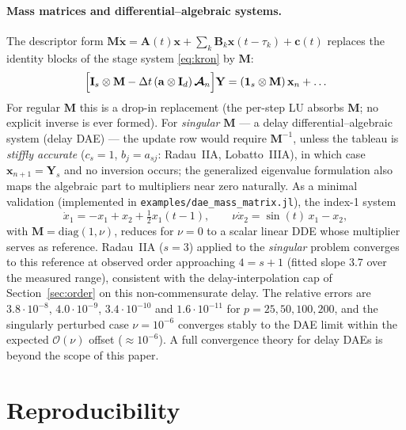 \documentclass[Afour,sageh,times]{sagej}
\begin{document}
\paragraph{Mass matrices and differential--algebraic systems.} The
descriptor form $\mathbf{M}\dot{\mathbf{x}} = \mathbf{A}(t)\mathbf{x} +
\sum_k \mathbf{B}_k \mathbf{x}(t-\tau_k) + \mathbf{c}(t)$ replaces the
identity blocks of the stage system \eqref{eq:kron} by $\mathbf{M}$:
\begin{equation}
  \Bigl[\mathbf{I}_{s}\otimes\mathbf{M}
        - \Delta t\,(\mathbf{a}\otimes\mathbf{I}_d)\,
        \boldsymbol{\mathcal{A}}_n\Bigr]\mathbf{Y}
  = (\mathbf{1}_{s}\otimes\mathbf{M})\,\mathbf{x}_n + \ldots
\end{equation}
For regular $\mathbf{M}$ this is a drop-in replacement (the per-step LU
absorbs $\mathbf{M}$; no explicit inverse is ever formed). For
\emph{singular} $\mathbf{M}$ --- a delay differential--algebraic system
(delay DAE) ---
the update row would require $\mathbf{M}^{-1}$, unless the tableau is
\emph{stiffly accurate} ($c_s = 1$, $b_j = a_{sj}$: Radau~IIA,
Lobatto~IIIA), in which case $\mathbf{x}_{n+1} = \mathbf{Y}_s$ and no
inversion occurs; the generalized eigenvalue formulation also maps the
algebraic part to multipliers near zero naturally. As a minimal validation
(implemented in \texttt{examples/dae\_mass\_matrix.jl}), the index-1 system
\begin{equation*}
  \dot{x}_1 = -x_1 + x_2 + \tfrac12 x_1(t-1), \qquad
  \nu \dot{x}_2 = \sin(t)\,x_1 - x_2,
\end{equation*}
with $\mathbf{M} = \mathrm{diag}(1, \nu)$, reduces for
$\nu = 0$ to a scalar linear DDE whose multiplier serves as reference.
Radau~IIA ($s = 3$) applied to the \emph{singular} problem converges to this
reference at observed order approaching $4 = s{+}1$ (fitted slope $3.7$
over the measured range), consistent with the delay-interpolation cap of
Section~\ref{sec:order} on this non-commensurate delay. The relative errors
are $3.8\cdot10^{-8}$, $4.0\cdot10^{-9}$, $3.4\cdot10^{-10}$ and
$1.6\cdot10^{-11}$ for $p = 25, 50, 100, 200$, and the singularly perturbed case
$\nu = 10^{-6}$ converges stably to the DAE limit within the
expected $\mathcal{O}(\nu)$ offset ($\approx 10^{-6}$). A full
convergence theory for delay DAEs is beyond the scope of this paper.

\section{Reproducibility}
\label{app:repro}
\end{document}
